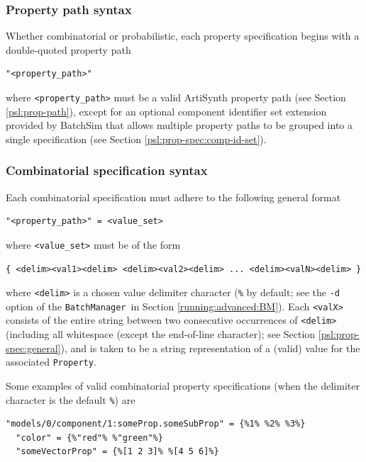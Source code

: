 \documentclass{article}
\newcommand{\BM}{{\tt BatchManager}}
\begin{document}
\subsubsection{Property path syntax}

Whether combinatorial or probabilistic, each property specification begins with a double-quoted property path

\begin{lstlisting}[]
  "<property_path>"
\end{lstlisting}

where {\tt <property\_path>} must be a valid ArtiSynth property path (see Section \ref{psl:prop-path}), except for an optional component identifier set extension provided by BatchSim that allows multiple property paths to be grouped into a single specification (see Section \ref{psl:prop-spec:comp-id-set}).

\subsubsection{Combinatorial specification syntax}
\label{psl:prop-spec:comb-spec}

Each combinatorial specification must adhere to the following general format

\begin{lstlisting}[]
  "<property_path>" = <value_set>
\end{lstlisting}

where {\tt <value\_set>} must be of the form

\begin{lstlisting}[]
   { <delim><val1><delim> <delim><val2><delim> ... <delim><valN><delim> }
\end{lstlisting}

where {\tt <delim>} is a chosen value delimiter character ({\tt \%} by default; see the {\tt -d} option of the \BM\ in Section \ref{running:advanced:BM}). Each {\tt <valX>} consists of the entire string between two consecutive occurrences of {\tt <delim>} (including all whitespace (except the end-of-line character); see Section \ref{psl:prop-spec:general}), and is taken to be a string representation of a (valid) value for the associated {\tt Property}.

Some examples of valid combinatorial property specifications (when the delimiter character is the default {\tt \%}) are

\begin{lstlisting}[]
  "models/0/component/1:someProp.someSubProp" = {%1% %2% %3%}
  "color" = {%"red"% %"green"%}
  "someVectorProp" = {%[1 2 3]% %[4 5 6]%}
\end{lstlisting}
\end{document}
